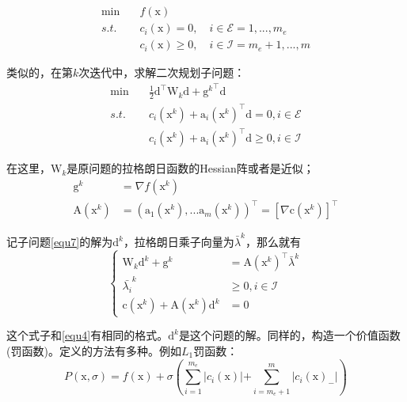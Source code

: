 \documentclass[a4paper]{D:/repositories/MyDGP/latex/PaperReadingLog}
\begin{document}
\begin{equation}
    \label{equ6}
    \begin{aligned}
        \min\quad& f(\mathrm{x})\\
        s.t.\quad& c_i(\mathrm{x})=0,\quad i\in\mathcal{E}={1,...,m_e}\\
                      & c_i(\mathrm{x})\ge 0,\quad i\in\mathcal{I}={m_e+1,...,m}
    \end{aligned}        
\end{equation}

类似的，在第$k$次迭代中，求解二次规划子问题：
\begin{equation}
    \label{equ7}
    \begin{aligned}
        \min\quad&\frac{1}{2}\mathrm{d}^\top\mathrm{W}_k\mathrm{d}+{\mathrm{g}^k}^\top\mathrm{d}\\
        s.t.\quad&c_i(\mathrm{x}^k)+\mathrm{a}_i(\mathrm{x}^k)^\top\mathrm{d}=0,i\in\mathcal{E}\\
        &c_i(\mathrm{x}^k)+\mathrm{a}_i(\mathrm{x}^k)^\top\mathrm{d}\ge 0,i\in\mathcal{I}
    \end{aligned}
\end{equation}

在这里，$\mathrm{W}_k$是原问题的拉格朗日函数的Hessian阵或者是近似；
$$
\begin{aligned}
    \mathrm{g}^k&=\nabla f(\mathrm{x}^k)\\
    \mathrm{A}(\mathrm{x}^k)&=(\mathrm{a}_1(\mathrm{x}^k),...\mathrm{a}_m(\mathrm{x}^k))^\top=[\nabla\mathrm{c}(\mathrm{x}^k)]^\top
\end{aligned}
$$

记子问题\ref{equ7}的解为$\mathrm{d}^k$，拉格朗日乘子向量为$\bar{\lambda}^k$，那么就有
\begin{equation}
\label{equ8}
    \left\{
    \begin{aligned}
        \mathrm{W}_k\mathrm{d}^k+\mathrm{g}^k&=\mathrm{A}(\mathrm{x}^k)^\top\bar{\lambda}^k\\
        \bar{\lambda_i}^k&\ge 0,i\in\mathcal{I}\\
        \mathrm{c}(\mathrm{x}^k)+\mathrm{A}(\mathrm{x}^k)\mathrm{d}^k&=0
    \end{aligned}
\right.
\end{equation}

这个式子和\ref{equ4}有相同的格式。$\mathrm{d}^k$是这个问题的解。同样的，构造一个价值函数(罚函数)。定义的方法有多种。例如$L_1$罚函数：
$$
P(\mathrm{x},\sigma)=f(\mathrm{x})+\sigma(\sum_{i=1}^{m_e}\lvert c_i(\mathrm{x})\lvert+\sum_{i=m_e+1}^m\lvert c_i(\mathrm{x})_{-}\lvert)
$$
\end{document}
